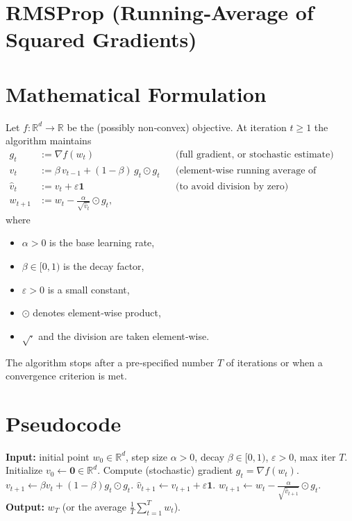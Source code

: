 \documentclass{article}
\newcommand{\R}{\mathbb{R}}
\begin{document}
\section*{RMSProp (Running‑Average of Squared Gradients)}

\section*{Mathematical Formulation}
Let $f:\R^d\rightarrow\R$ be the (possibly non‑convex) objective.  
At iteration $t\ge 1$ the algorithm maintains
\[
\begin{aligned}
g_t &:= \nabla f(w_t)                &&\text{(full gradient, or stochastic estimate)}\\
v_t &:= \beta\, v_{t-1} + (1-\beta)\, g_t\odot g_t
      &&\text{(element‑wise running average of squared gradients)}\\
\hat v_t &:= v_t + \varepsilon\mathbf 1   &&\text{(to avoid division by zero)}\\
w_{t+1} &:= w_t - \frac{\alpha}{\sqrt{\hat v_t}}\odot g_t,
\end{aligned}
\]
where  
\begin{itemize}[noitemsep,topsep=0pt]
\item $\alpha>0$ is the base learning rate,
\item $\beta\in[0,1)$ is the decay factor,
\item $\varepsilon>0$ is a small constant,
\item $\odot$ denotes element‑wise product,
\item $\sqrt{\cdot}$ and the division are taken element‑wise.
\end{itemize}
The algorithm stops after a pre‑specified number $T$ of iterations or when a
convergence criterion is met.

\section*{Pseudocode}
\begin{algorithm}[H]
\caption{RMSProp}
\begin{algorithmic}[1]
\STATE \textbf{Input:} initial point $w_0\in\R^d$, step size $\alpha>0$, decay $\beta\in[0,1)$, $\varepsilon>0$, max iter $T$.
\STATE Initialize $v_0\gets \mathbf 0\in\R^d$.
    \STATE Compute (stochastic) gradient $g_t = \nabla f(w_t)$.
    \STATE $v_{t+1}\gets \beta v_t + (1-\beta) g_t\odot g_t$.
    \STATE $\hat v_{t+1}\gets v_{t+1}+ \varepsilon\mathbf 1$.
    \STATE $w_{t+1}\gets w_t - \displaystyle\frac{\alpha}{\sqrt{\hat v_{t+1}}}\odot g_t$.
\ENDFOR
\STATE \textbf{Output:} $w_T$ (or the average $\frac1T\sum_{t=1}^T w_t$).
\end{algorithmic}
\end{algorithm}
\end{document}
